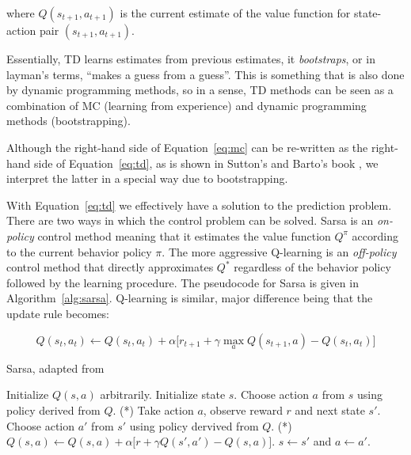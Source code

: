 \documentclass{article} %
\begin{document}
where $Q(s_{t+1}, a_{t+1})$ is the current estimate of the value function for
state-action pair $(s_{t+1}, a_{t+1})$.

Essentially, TD learns estimates from previous estimates, it \emph{bootstraps},
or in layman's terms, ``makes a guess from a guess''.  This is something
that is also done by dynamic programming methods, so in a sense, TD methods can
be seen as a combination of MC (learning from experience) and dynamic
programming methods (bootstrapping).

Although the right-hand side of Equation~\ref{eq:mc} can be re-written as the
right-hand side of Equation~\ref{eq:td}, as is shown in Sutton's and Barto's
book \cite{book}, we interpret the latter in a special way due to
bootstrapping.

With Equation~\ref{eq:td} we effectively have a solution to the prediction
problem. There are two ways in which the control problem can be solved. Sarsa
is an \emph{on-policy} control method meaning that it estimates the value
function $Q^\pi$ according to the current behavior policy $\pi$. The more
aggressive Q-learning is an \emph{off-policy} control method that directly
approximates $Q^*$ regardless of the behavior policy followed by the learning
procedure. The pseudocode for Sarsa is given in Algorithm~\ref{alg:sarsa}.
Q-learning is similar, major difference being that the update rule becomes:

\begin{equation}\label{eq:qlearning}
  Q(s_t, a_t) \leftarrow
  Q(s_t, a_t) + \alpha \big[ r_{t+1} + \gamma \max_a Q(s_{t+1}, a)
  - Q(s_t, a_t)\big]
\end{equation}

\begin{algorithm}[H]
  \caption{Sarsa, adapted from \cite{book}}
  \label{alg:sarsa}
  \begin{algorithmic}[1]
    \State Initialize $Q(s, a)$ arbitrarily.
      \State Initialize state $s$.
      \State Choose action $a$ from $s$ using policy derived from $Q$. (*)
        \State Take action $a$, observe reward $r$ and next state $s'$.
        \State Choose action $a'$ from $s'$ using policy dervived from $Q$. (*)
        \State $Q(s, a) \leftarrow Q(s, a) + \alpha \big[ r + \gamma Q(s',a') - Q(s, a)\big]$.
        \State $s \leftarrow s'$ and $a \leftarrow a'$.
      \EndFor
    \EndFor
  \end{algorithmic}
\end{algorithm}
\end{document}
